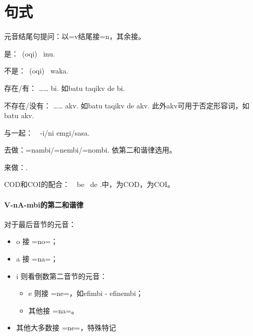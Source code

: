 \section{句式}

元音结尾句提问：以=v结尾接=n，其余接。

是：\A\ (oqi) \B\ inu.

不是：\A\ (oqi) \B\ waka.

存在/有： …… bi. 如batu taqikv de bi.

不存在/没有： …… akv. 如batu taqikv de akv. 此外akv可用于否定形容词，如batu    akv.

\A 与\B 一起：\A\ \B\ -i/ni emgi/sasa.

去做\V ：\V =nambi/\V =nembi/\V =nombi. 依第二和谐律选用。

来做\V ：\V {}.

COD和COI的配合：\A\ \B\ be \C\ de .中，\B 为COD，\C 为COI。

\paragraph{{\latin V-nA-mbi}的第二和谐律} 对于最后音节的元音：
\begin{itemize}
    \item o 接 =no=；
    \item a 接 =na=；
    \item i 则看倒数第二音节的元音：
    \begin{itemize}
        \item e 则接 =ne=，如efimbi - efinembi；
        \item 其他接 =na=。 
    \end{itemize}
    \item 其他大多数接 =ne=，特殊特记
\end{itemize}